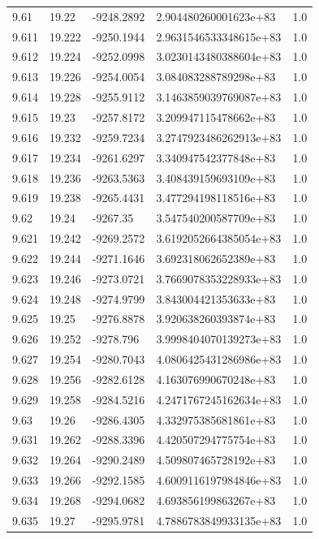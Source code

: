 \begin{tabular}{lllll}
9.61 & 19.22 & -9248.2892 & 2.904480260001623e+83 & 1.0 \\
9.611 & 19.222 & -9250.1944 & 2.9631546533348615e+83 & 1.0 \\
9.612 & 19.224 & -9252.0998 & 3.0230143480388604e+83 & 1.0 \\
9.613 & 19.226 & -9254.0054 & 3.084083288789298e+83 & 1.0 \\
9.614 & 19.228 & -9255.9112 & 3.1463859039769087e+83 & 1.0 \\
9.615 & 19.23 & -9257.8172 & 3.209947115478662e+83 & 1.0 \\
9.616 & 19.232 & -9259.7234 & 3.2747923486262913e+83 & 1.0 \\
9.617 & 19.234 & -9261.6297 & 3.340947542377848e+83 & 1.0 \\
9.618 & 19.236 & -9263.5363 & 3.408439159693109e+83 & 1.0 \\
9.619 & 19.238 & -9265.4431 & 3.477294198118516e+83 & 1.0 \\
9.62 & 19.24 & -9267.35 & 3.547540200587709e+83 & 1.0 \\
9.621 & 19.242 & -9269.2572 & 3.6192052664385054e+83 & 1.0 \\
9.622 & 19.244 & -9271.1646 & 3.692318062652389e+83 & 1.0 \\
9.623 & 19.246 & -9273.0721 & 3.7669078353228933e+83 & 1.0 \\
9.624 & 19.248 & -9274.9799 & 3.843004421353633e+83 & 1.0 \\
9.625 & 19.25 & -9276.8878 & 3.920638260393874e+83 & 1.0 \\
9.626 & 19.252 & -9278.796 & 3.9998404070139273e+83 & 1.0 \\
9.627 & 19.254 & -9280.7043 & 4.0806425431286986e+83 & 1.0 \\
9.628 & 19.256 & -9282.6128 & 4.163076990670248e+83 & 1.0 \\
9.629 & 19.258 & -9284.5216 & 4.2471767245162634e+83 & 1.0 \\
9.63 & 19.26 & -9286.4305 & 4.332975385681861e+83 & 1.0 \\
9.631 & 19.262 & -9288.3396 & 4.420507294775754e+83 & 1.0 \\
9.632 & 19.264 & -9290.2489 & 4.509807465728192e+83 & 1.0 \\
9.633 & 19.266 & -9292.1585 & 4.6009116197984846e+83 & 1.0 \\
9.634 & 19.268 & -9294.0682 & 4.693856199863267e+83 & 1.0 \\
9.635 & 19.27 & -9295.9781 & 4.7886783849933135e+83 & 1.0 \\

\end{tabular}
